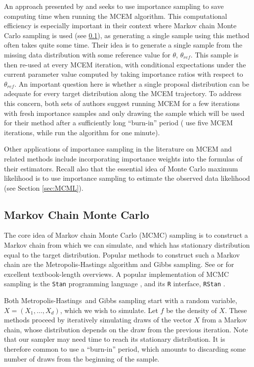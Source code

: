 \documentclass[11pt, oneside]{article}   	%
\newcommand{\mh}{Metropolis-Hastings}
\begin{document}
An approach presented by \citet{Qui99} and \citet{Lev01} seeks to use importance sampling to save computing time when running the MCEM algorithm. This computational efficiency is especially important in their context where Markov chain Monte Carlo sampling is used (see \ref{sec:MCMC}), as generating a single sample using this method often takes quite some time. Their idea is to generate a single sample from the missing data distribution with some reference value for $\theta$, $\theta_{ref}$. This sample is then re-used at every MCEM iteration, with conditional expectations under the current parameter value computed by taking importance ratios with respect to $\theta_{ref}$. An important question here is whether a single proposal distribution can be adequate for every target distribution along the MCEM trajectory. To address this concern, both sets of authors suggest running MCEM for a few iterations with fresh importance samples and only drawing the sample which will be used for their method after a sufficiently long ``burn-in'' period (\citeauthor{Qui99} use five MCEM iterations, while \citeauthor{Lev01} run the algorithm for one minute).

Other applications of importance sampling in the literature on MCEM and related methods include \citet{Caf05} incorporating importance weights into the formulas of their estimators. Recall also that the essential idea of Monte Carlo maximum likelihood is to use importance sampling to estimate the observed data likelihood (see Section \ref{sec:MCML}).


\subsection{Markov Chain Monte Carlo}
\label{sec:MCMC}

The core idea of Markov chain Monte Carlo (MCMC) sampling is to construct a Markov chain from which we can simulate, and which has stationary distribution equal to the target distribution. Popular methods to construct such a Markov chain are the Metropolis-Hastings algorithm and Gibbs sampling. See \citet{Gel13} or \citet{Rob04} for excellent textbook-length overviews. A popular implementation of MCMC sampling is the \texttt{Stan} programming language \citep{Sta22}, and its \texttt{R} interface, \texttt{RStan} \citep{Sta23}.

Both \mh\ and Gibbs sampling start with a random variable, $X = (X_1, \ldots, X_d)$, which we wish to simulate. Let $f$ be the density of $X$. These methods proceed by iteratively simulating draws of the vector $X$ from a Markov chain, whose distribution depends on the draw from the previous iteration. Note that our sampler may need time to reach its stationary distribution. It is therefore common to use a ``burn-in'' period, which amounts to discarding some number of draws from the beginning of the sample.
\end{document}
